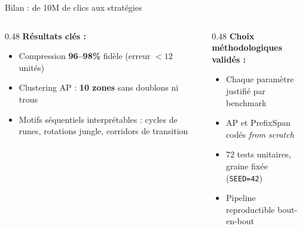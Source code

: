 \documentclass[aspectratio=169, 11pt]{beamer}
\begin{document}
\begin{frame}{Bilan : de 10M de clics aux stratégies}
\vspace{0.4cm}

\begin{columns}[T]
\begin{column}{0.48\textwidth}
    \textbf{Résultats clés :}
    \begin{itemize}\setlength{\itemsep}{2pt}
        \item Compression \textbf{96--98\%} fidèle (erreur $< 12$ unités)
        \item Clustering AP : \textbf{10 zones} sans doublons ni trous
        \item Motifs séquentiels interprétables : cycles de runes, rotations jungle, corridors de transition
    \end{itemize}
\end{column}
\begin{column}{0.48\textwidth}
    \textbf{Choix méthodologiques validés :}
    \begin{itemize}\setlength{\itemsep}{2pt}
        \item Chaque paramètre justifié par benchmark
        \item AP et PrefixSpan codés \textit{from scratch}
        \item 72 tests unitaires, graine fixée (\texttt{SEED=42})
        \item Pipeline reproductible bout-en-bout
    \end{itemize}
\end{column}
\end{columns}

\end{frame}
\end{document}
